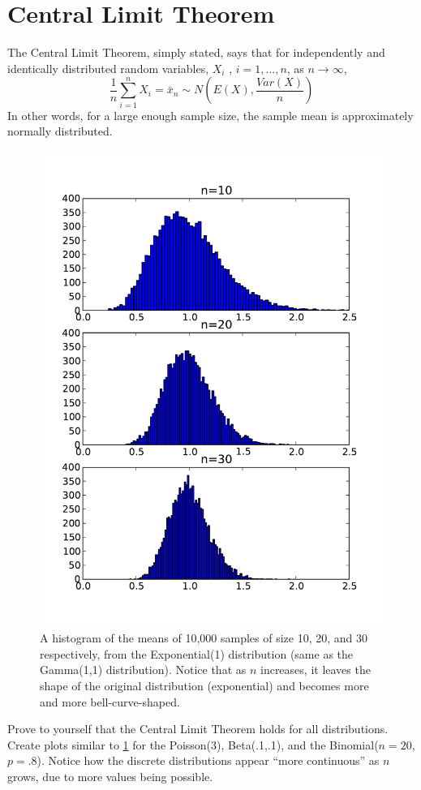 \section*{Central Limit Theorem}
The Central Limit Theorem, simply stated, says that for independently and identically distributed random variables, $X_i$ , $i = 1, \dots, n$, as $n \rightarrow \infty$,
\[ 
\frac{1}{n} \sum^n_{i=1} X_i = \bar{x}_n \sim N\left(E(X), \frac{Var(X)}{n}\right)
\]
In other words, for a large enough sample size, the sample mean is approximately normally distributed. 
\begin{figure}[h]
\includegraphics[width=\textwidth]{multiplot.pdf}
\caption{A histogram of the means of 10,000 samples of size 10, 20, and 30 respectively, from the Exponential(1) distribution (same as the Gamma(1,1) distribution). Notice that as $n$ increases, it leaves the shape of the original distribution (exponential) and becomes more and more bell-curve-shaped.}
\label{fig:CLT}
\end{figure}

\begin{problem}
Prove to yourself that the Central Limit Theorem holds for all distributions.  Create plots similar to \ref{fig:CLT} for the Poisson(3), Beta(.1,.1), and the Binomial($n=20$,$p=.8$). Notice how the discrete distributions appear ``more continuous'' as $n$ grows, due to more values being possible. 
\end{problem}

